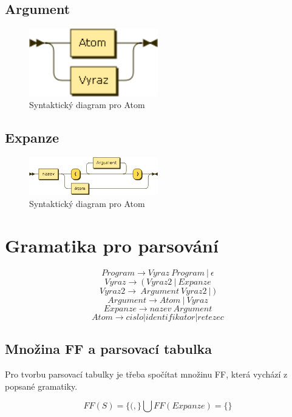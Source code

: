 \documentclass[a4paper,11pt]{article}
\begin{document}
\subsection{Argument}
\begin{figure}[!h]
    \centering
    \includegraphics[width=0.5\textwidth]{obrazky/Argument.png}
    \caption{Syntaktický diagram pro Atom}
    \label{fig:Syntaktický diagram pro Atom}
\end{figure}

\subsection{Expanze}
\begin{figure}[!h]
    \centering
    \includegraphics[width=0.5\textwidth]{obrazky/Expanze.png}
    \caption{Syntaktický diagram pro Atom}
    \label{fig:Syntaktický diagram pro Atom}
\end{figure}

\section{Gramatika pro parsování}
$$Program \rightarrow Vyraz\:Program\:|\:\epsilon$$
$$Vyraz \rightarrow\:(\:Vyraz2\:|\:Expanze$$
$$Vyraz2 \rightarrow\:Argument\:Vyraz2\:|\:)$$
$$Argument \rightarrow Atom\:|\:Vyraz$$
$$Expanze \rightarrow nazev\:Argument$$
$$Atom \rightarrow cislo | identifikator | retezec$$

\subsection{Množina FF a parsovací tabulka}
Pro tvorbu parsovací tabulky je třeba spočítat množinu FF, která vychází z popsané gramatiky.

$$FF(S) = \{(,\} \bigcup FF(Expanze) = \{\}$$
\end{document}
